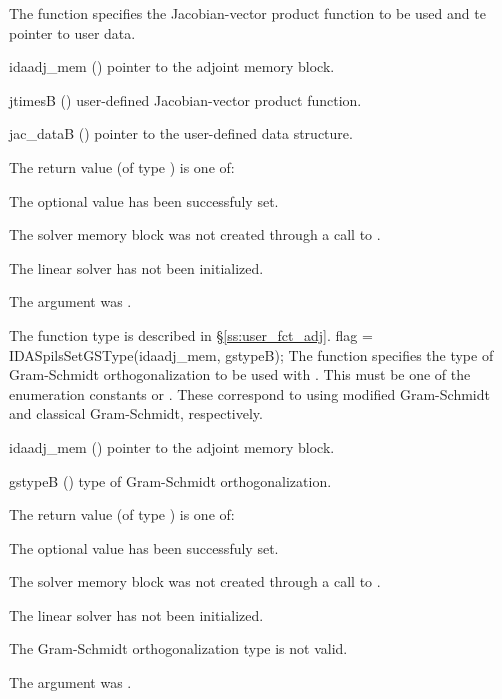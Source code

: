 {
  The function  specifies the Jacobian-vector 
  product function to be used and te pointer to user data.
}
{
  \begin{args}
  \item[idaadj\_mem] ()
    pointer to the adjoint memory block.
  \item[jtimesB] ()
    user-defined Jacobian-vector product function.
  \item[jac\_dataB] ()
    pointer to the user-defined data structure.
  \end{args}
}
{
  The return value  (of type ) is one of:
  \begin{args}
  \item[\Id{IDASPILS\_SUCCESS}] 
    The optional value has been successfuly set.
  \item[\Id{IDASPILS\_MEM\_NULL}]
    The {\idas} solver memory block was not created through a call to .
  \item[\Id{IDASPILS\_LMEM\_NULL}]
    The {\idaspgmr} linear solver has not been initialized.
  \item[\Id{IDASPILS\_ADJMEM\_NULL}]
    The  argument was .
  \end{args}
}
{
  The function type  is described in \S\ref{ss:user_fct_adj}.
}
{
  flag = IDASpilsSetGSType(idaadj\_mem, gstypeB);
}
{
  The function  specifies the type of
  Gram-Schmidt orthogonalization to be used with {\idaspgmr}.
  This must be one of the enumeration constants 
  or . These correspond to using modified Gram-Schmidt 
  and classical Gram-Schmidt, respectively. 
}
{
  \begin{args}
  \item[idaadj\_mem] ()
    pointer to the adjoint memory block.
  \item[gstypeB] ()
    type of Gram-Schmidt orthogonalization.
  \end{args}
}
{
  The return value  (of type ) is one of:
  \begin{args}
  \item[\Id{IDASPILS\_SUCCESS}] 
    The optional value has been successfuly set.
  \item[\Id{IDASPILS\_MEM\_NULL}]
    The {\idas} solver memory block was not created through a call to .
  \item[\Id{IDASPILS\_LMEM\_NULL}]
    The {\idaspgmr} linear solver has not been initialized.
  \item[\Id{IDASPILS\_ILL\_INPUT}]
    The Gram-Schmidt orthogonalization type  is not valid.
  \item[\Id{IDASPILS\_ADJMEM\_NULL}]
    The  argument was .
  \end{args}
}

